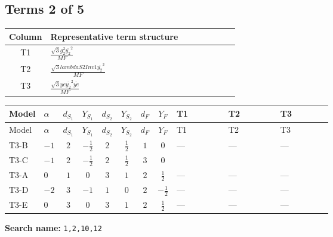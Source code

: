 \documentclass[8pt]{article}
\begin{document}
\begin{landscape}
\subsection*{Terms 2 of 5}
\begin{center}
\begin{tabular}{@{}c >{\raggedright\arraybackslash}p{0.82\linewidth}@{}}
\toprule
Column & Representative term structure \\
\midrule
T1 & \(\displaystyle \frac{\sqrt{3} g_{2}^{2} \overline{y_{2}}^{2}}{MF}\) \\
\midrule
T2 & \(\displaystyle \frac{\sqrt{3} lambdaS2Inv1 \overline{y_{2}}^{2}}{MF}\) \\
\midrule
T3 & \(\displaystyle \frac{\sqrt{3} ye \overline{y_{2}}^{2} \overline{ye}}{MF}\) \\
\midrule
\bottomrule
\end{tabular}
\end{center}
\smallskip
\tiny
\begin{longtable}{@{}llcccccc >{\raggedright\arraybackslash}p{0.21\linewidth} >{\raggedright\arraybackslash}p{0.21\linewidth} >{\raggedright\arraybackslash}p{0.21\linewidth}@{}}
\toprule
Model & $\alpha$ & $d_{S_1}$ & $Y_{S_1}$ & $d_{S_2}$ & $Y_{S_2}$ & $d_F$ & $Y_F$ & T1 & T2 & T3 \\
\midrule
\endfirsthead
\toprule
Model & $\alpha$ & $d_{S_1}$ & $Y_{S_1}$ & $d_{S_2}$ & $Y_{S_2}$ & $d_F$ & $Y_F$ & T1 & T2 & T3 \\
\midrule
\endhead
T3-B & $-1$ & $2$ & $-\frac{1}{2}$ & $2$ & $\frac{1}{2}$ & $1$ & $0$ & --- & --- & --- \\
\midrule
T3-C & $-1$ & $2$ & $-\frac{1}{2}$ & $2$ & $\frac{1}{2}$ & $3$ & $0$ & \scriptsize\adjustbox{max width=\linewidth}{$\begin{gathered} - \frac{\sqrt{3} g_{2}^{2} \overline{y_{2}}^{2}}{8 MF}\end{gathered}$} & \scriptsize\adjustbox{max width=\linewidth}{$\begin{gathered} - \frac{\sqrt{3} lambdaS2Inv1 \overline{y_{2}}^{2}}{12 MF}\end{gathered}$} & \scriptsize\adjustbox{max width=\linewidth}{$\begin{gathered} \frac{\sqrt{3} ye \overline{y_{2}}^{2} \overline{ye}}{24 MF}\end{gathered}$} \\
\midrule
T3-A & $0$ & $1$ & $0$ & $3$ & $1$ & $2$ & $\frac{1}{2}$ & --- & --- & --- \\
\midrule
T3-D & $-2$ & $3$ & $-1$ & $1$ & $0$ & $2$ & $-\frac{1}{2}$ & --- & --- & --- \\
\midrule
T3-E & $0$ & $3$ & $0$ & $3$ & $1$ & $2$ & $\frac{1}{2}$ & --- & --- & --- \\
\midrule
\bottomrule
\end{longtable}
\clearpage
\noindent\textbf{Search name: }\texttt{1,2,10,12}\par\smallskip

\end{landscape}
\end{document}
